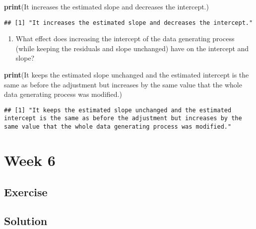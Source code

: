 \documentclass[
]{book}
\newenvironment{Shaded}{\begin{snugshade}}{\end{snugshade}}
\newcommand{\FunctionTok}[1]{\textcolor[rgb]{0.13,0.29,0.53}{\textbf{#1}}}
\newcommand{\NormalTok}[1]{#1}
\newcommand{\StringTok}[1]{\textcolor[rgb]{0.31,0.60,0.02}{#1}}
\providecommand{\tightlist}{%
  \setlength{\itemsep}{0pt}\setlength{\parskip}{0pt}}
\begin{document}
\begin{Shaded}
\begin{Highlighting}[]
\FunctionTok{print}\NormalTok{(}\StringTok{\textquotesingle{}It increases the estimated slope and decreases the intercept.\textquotesingle{}}\NormalTok{)}
\end{Highlighting}
\end{Shaded}

\begin{verbatim}
## [1] "It increases the estimated slope and decreases the intercept."
\end{verbatim}

\begin{enumerate}
\def\labelenumi{\roman{enumi}.}
\setcounter{enumi}{3}
\tightlist
\item
  What effect does increasing the intercept of the data generating process (while keeping the residuals and slope unchanged) have on the intercept and slope?
\end{enumerate}

\begin{Shaded}
\begin{Highlighting}[]
\FunctionTok{print}\NormalTok{(}\StringTok{\textquotesingle{}It keeps the estimated slope unchanged and the estimated intercept is the same as before the adjustment but increases by the same value that the whole data generating process was modified.\textquotesingle{}}\NormalTok{)}
\end{Highlighting}
\end{Shaded}

\begin{verbatim}
## [1] "It keeps the estimated slope unchanged and the estimated intercept is the same as before the adjustment but increases by the same value that the whole data generating process was modified."
\end{verbatim}

\hypertarget{week-6}{%
\chapter{Week 6}\label{week-6}}

\hypertarget{exercise-1}{%
\section{Exercise}\label{exercise-1}}

\hypertarget{solution-2}{%
\section{Solution}\label{solution-2}}
\end{document}
